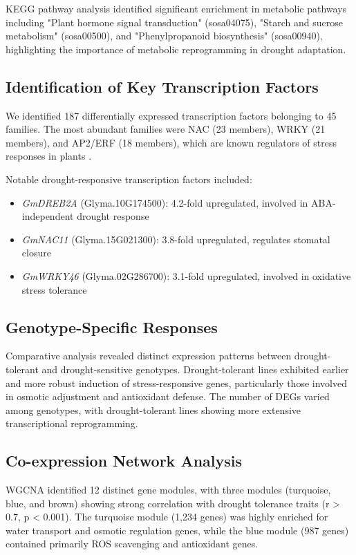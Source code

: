 \documentclass[11pt,a4paper]{article}
\begin{document}
KEGG pathway analysis identified significant enrichment in metabolic pathways including "Plant hormone signal transduction" (sosa04075), "Starch and sucrose metabolism" (sosa00500), and "Phenylpropanoid biosynthesis" (sosa00940), highlighting the importance of metabolic reprogramming in drought adaptation.

\subsection{Identification of Key Transcription Factors}

We identified 187 differentially expressed transcription factors belonging to 45 families. The most abundant families were NAC (23 members), WRKY (21 members), and AP2/ERF (18 members), which are known regulators of stress responses in plants \citep{Nakashima2012}.

Notable drought-responsive transcription factors included:
\begin{itemize}
\item \textit{GmDREB2A} (Glyma.10G174500): 4.2-fold upregulated, involved in ABA-independent drought response
\item \textit{GmNAC11} (Glyma.15G021300): 3.8-fold upregulated, regulates stomatal closure
\item \textit{GmWRKY46} (Glyma.02G286700): 3.1-fold upregulated, involved in oxidative stress tolerance
\end{itemize}

\subsection{Genotype-Specific Responses}

Comparative analysis revealed distinct expression patterns between drought-tolerant and drought-sensitive genotypes. Drought-tolerant lines exhibited earlier and more robust induction of stress-responsive genes, particularly those involved in osmotic adjustment and antioxidant defense. The number of DEGs varied among genotypes, with drought-tolerant lines showing more extensive transcriptional reprogramming.

\subsection{Co-expression Network Analysis}

WGCNA identified 12 distinct gene modules, with three modules (turquoise, blue, and brown) showing strong correlation with drought tolerance traits (r > 0.7, p < 0.001). The turquoise module (1,234 genes) was highly enriched for water transport and osmotic regulation genes, while the blue module (987 genes) contained primarily ROS scavenging and antioxidant genes.
\end{document}
